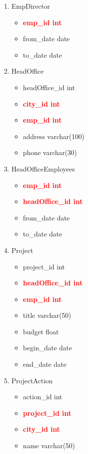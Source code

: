 \documentclass[]{article}
\begin{document}
\begin{enumerate}
\begin{enumerate}
\begin{enumerate}
\item EmpDirector
\begin{itemize}
\item \textcolor{red}{\textbf{emp\_id int}}
\item from\_date date
\item to\_date date
\end{itemize}

\item HeadOffice
\begin{itemize}
\item headOffice\_id int
\item \textcolor{red}{\textbf{city\_id int}}
\item \textcolor{red}{\textbf{emp\_id int}}
\item address varchar(100)
\item phone	varchar(30)
\end{itemize}

\item HeadOfficeEmployees
\begin{itemize}
\item \textcolor{red}{\textbf{emp\_id int}}
\item \textcolor{red}{\textbf{headOffice\_id int}}
\item from\_date date
\item to\_date date
\end{itemize}

\item Project
\begin{itemize}
\item project\_id int
\item \textcolor{red}{\textbf{headOffice\_id int}}
\item \textcolor{red}{\textbf{emp\_id int}}
\item title varchar(50)
\item budget float
\item begin\_date date
\item end\_date date
\end{itemize}

\item ProjectAction
\begin{itemize}
\item action\_id int
\item \textcolor{red}{\textbf{project\_id int}}
\item \textcolor{red}{\textbf{city\_id int}}
\item name varchar(50)
\end{itemize}


\end{enumerate}
\end{enumerate}
\end{enumerate}
\end{document}
